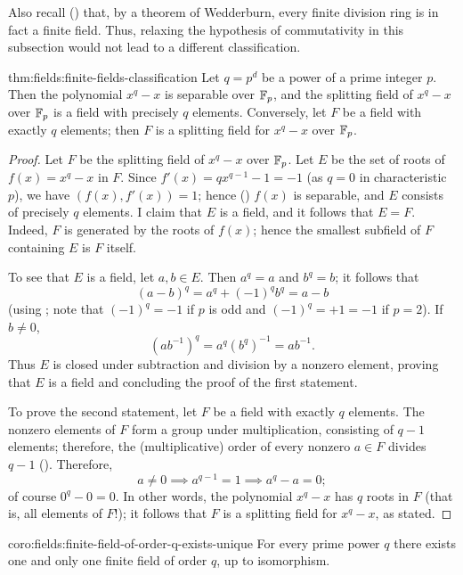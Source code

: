 Also recall () that, by a theorem of
Wedderburn, every finite division ring is in fact a finite
field. Thus, relaxing the hypothesis of commutativity in this
subsection would not lead to a different classification.
\begin{thm}{}{thm:fields:finite-fields-classification}
  Let $q = p^d$ be a power of a prime integer $p$. Then the polynomial
  $x^q - x$ is separable over $\mathbb{F}_p$, and the splitting field of
  $x^q - x$ over $\mathbb{F}_p$ is a field with precisely $q$ elements.
  Conversely, let $F$ be a field with exactly $q$ elements; then $F$
  is a splitting field for $x^q - x$ over $\mathbb{F}_p$.
\end{thm}
\begin{proof}
  Let $F$ be the splitting field of $x^q - x$ over $\mathbb{F}_p$. Let $E$ be
  the set of roots of $f(x) = x^q - x$ in $F$. Since
  $f'(x) = qx^{q-1} - 1 = -1$ (as $q = 0$ in characteristic $p$), we
  have $(f(x), f'(x)) = 1$; hence () $f(x)$ is
  separable, and $E$ consists of precisely $q$ elements. I claim that
  $E$ is a field, and it follows that $E = F$. Indeed, $F$ is
  generated by the roots of $f(x)$; hence the smallest subfield of $F$
  containing $E$ is $F$ itself.

  To see that $E$ is a field, let $a, b \in E$. Then $a^q = a$ and
  $b^q = b$; it follows that
  \[
    (a - b)^q = a^q + (-1)^q b^q = a - b
  \]
  (using ; note that
  $(-1)^q = -1$ if $p$ is odd and $(-1)^q = +1 = -1$ if $p = 2$). If
  $b \neq 0$,
  \[
    (ab^{-1})^q = a^q (b^q)^{-1} = ab^{-1}.
  \]
  Thus $E$ is closed under subtraction and division by a nonzero
  element, proving that $E$ is a field and concluding the proof of the
  first statement.

  To prove the second statement, let $F$ be a field with exactly $q$
  elements. The nonzero elements of $F$ form a group under
  multiplication, consisting of $q - 1$ elements; therefore, the
  (multiplicative) order of every nonzero $a \in F$ divides $q - 1$
  (). Therefore,
  \[
    a \neq 0 \implies a^{q-1} = 1 \implies a^q - a = 0;
  \]
  of course $0^q - 0 = 0$. In other words, the polynomial $x^q - x$
  has $q$ roots in $F$ (that is, all elements of $F$!); it follows
  that $F$ is a splitting field for $x^q - x$, as stated.
\end{proof}
\begin{coro}{}{coro:fields:finite-field-of-order-q-exists-unique}
  For every prime power $q$ there exists one and only one finite field
  of order $q$, up to isomorphism.
\end{coro}
